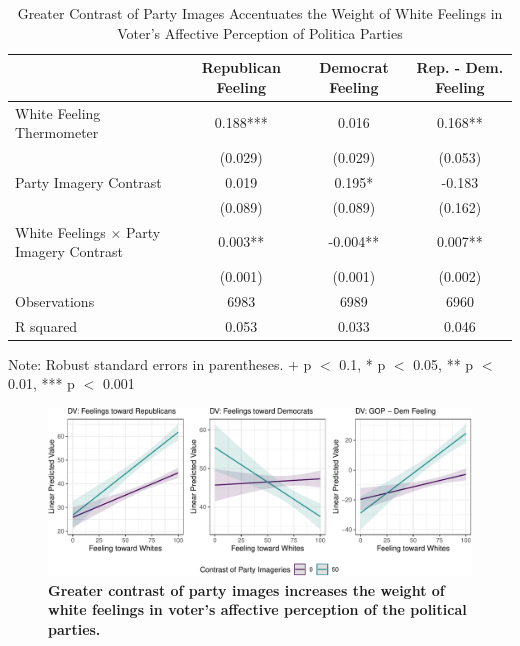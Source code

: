 \documentclass[
  12pt,
]{article}
\begin{document}
\hypertarget{tbl-mechanism}{}
\begin{table}
\caption{\label{tbl-mechanism}Greater Contrast of Party Images Accentuates the Weight of White
Feelings in Voter's Affective Perception of Politica Parties }\tabularnewline

\centering
\begin{threeparttable}
\begin{tabular}[t]{lccc}
\toprule
  & Republican Feeling & Democrat Feeling & Rep. - Dem. Feeling\\
\midrule
White Feeling Thermometer & 0.188*** & 0.016 & 0.168**\\
 & (0.029) & (0.029) & (0.053)\\
Party Imagery Contrast & 0.019 & 0.195* & -0.183\\
 & (0.089) & (0.089) & (0.162)\\
White Feelings × Party Imagery Contrast & 0.003** & -0.004** & 0.007**\\
 & (0.001) & (0.001) & (0.002)\\
\midrule
Observations & 6983 & 6989 & 6960\\
R squared & 0.053 & 0.033 & 0.046\\
\bottomrule
\end{tabular}
\begin{tablenotes}
\item Note: Robust standard errors in parentheses. + p $<$ 0.1, * p $<$ 0.05, ** p $<$ 0.01, *** p $<$ 0.001
\end{tablenotes}
\end{threeparttable}
\end{table}

\begin{figure}[tb]

{\centering \includegraphics{paper_files/figure-pdf/fig-mechanism-1.pdf}

}

\caption{\label{fig-mechanism}\textbf{Greater contrast of party images
increases the weight of white feelings in voter's affective perception
of the political parties.}}

\end{figure}
\end{document}
